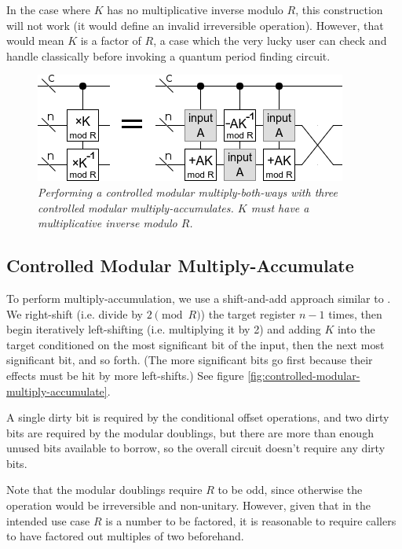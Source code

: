 \documentclass[twocolumn]{article}
\begin{document}
In the case where $K$ has no multiplicative inverse modulo $R$, this construction will not work (it would define an invalid irreversible operation).
However, that would mean $K$ is a factor of $R$, a case which the very lucky user can check and handle classically before invoking a quantum period finding circuit.

\begin{figure}
  \centering
  \includegraphics[width=\linewidth]{assets/controlled-modular-multiply.png}
  \caption{\em
    Performing a controlled modular multiply-both-ways with three controlled modular multiply-accumulates.
    $K$ must have a multiplicative inverse modulo $R$.
  }
  \label{fig:controlled-modular-multiply}
\end{figure}

\subsection{Controlled Modular Multiply-Accumulate}

To perform multiply-accumulation, we use a shift-and-add approach similar to \cite{beauregard2003}.
We right-shift (i.e. divide by $2 {\pmod R}$) the target register $n-1$ times, then begin iteratively left-shifting (i.e. multiplying it by 2) and adding $K$ into the target conditioned on the most significant bit of the input, then the next most significant bit, and so forth.
(The more significant bits go first because their effects must be hit by more left-shifts.)
See figure \ref{fig:controlled-modular-multiply-accumulate}.

A single dirty bit is required by the conditional offset operations, and two dirty bits are required by the modular doublings, but there are more than enough unused bits available to borrow, so the overall circuit doesn't require any dirty bits.

Note that the modular doublings require $R$ to be odd, since otherwise the operation would be irreversible and non-unitary.
However, given that in the intended use case $R$ is a number to be factored, it is reasonable to require callers to have factored out multiples of two beforehand.
\end{document}
